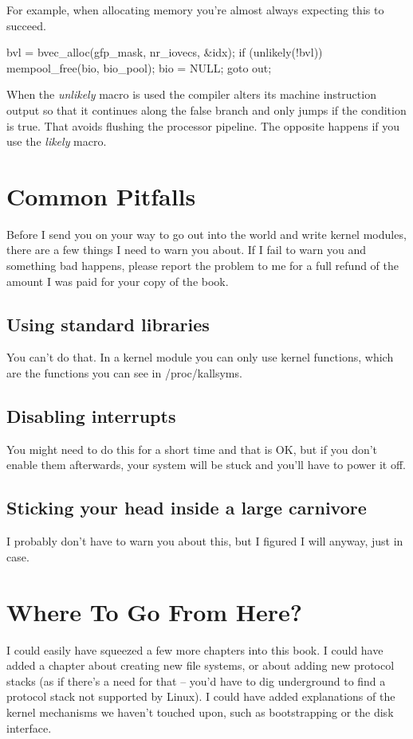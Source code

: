 \documentclass[10pt, oneside]{book}
\begin{document}
For example, when allocating memory you're almost always expecting this to succeed.

\begin{code}
bvl = bvec_alloc(gfp_mask, nr_iovecs, &idx);
if (unlikely(!bvl)) {
  mempool_free(bio, bio_pool);
  bio = NULL;
  goto out;
}
\end{code}

When the \emph{unlikely} macro is used the compiler alters its machine instruction output so that it continues along the false branch and only jumps if the condition is true. That avoids flushing the processor pipeline. The opposite happens if you use the \emph{likely} macro.
\section{Common Pitfalls}
\label{sec:org0e8d92a}
Before I send you on your way to go out into the world and write kernel modules, there are a few things I need to warn you about. If I fail to warn you and something bad happens, please report the problem to me for a full refund of the amount I was paid for your copy of the book.

\subsection{Using standard libraries}
\label{sec:orgba512d5}
You can't do that. In a kernel module you can only use kernel functions, which are the functions you can see in /proc/kallsyms.

\subsection{Disabling interrupts}
\label{sec:org377e4a8}
You might need to do this for a short time and that is OK, but if you don't enable them afterwards, your system will be stuck and you'll have to power it off.

\subsection{Sticking your head inside a large carnivore}
\label{sec:orgc0f5914}
I probably don't have to warn you about this, but I figured I will anyway, just in case.

\section{Where To Go From Here?}
\label{sec:org0a4192c}
I could easily have squeezed a few more chapters into this book. I could have added a chapter about creating new file systems, or about adding new protocol stacks (as if there's a need for that -- you'd have to dig underground to find a protocol stack not supported by Linux). I could have added explanations of the kernel mechanisms we haven't touched upon, such as bootstrapping or the disk interface.
\end{document}
